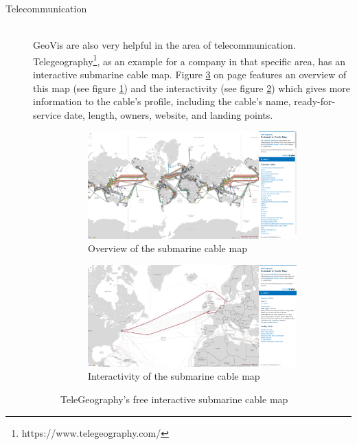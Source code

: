 \begin{description}
\item[Telecommunication] \hfill \\
\ac{GeoVis} are also very helpful in the area of telecommunication. Telegeography\footnote{https://www.telegeography.com/}, as an example for a company in that specific area, has an interactive submarine cable map. Figure \ref{fig:both-submarines} on page \pageref{fig:both-submarines} features an overview of this map (see figure \ref{fig:submarine}) and the interactivity (see figure \ref{fig:submarine-interactive}) which gives more information to the cable’s profile, including the cable’s name, ready-for-service date, length, owners, website, and landing points.

\begin{figure}[!htb]
  \captionsetup[subfigure]{justification=centering}
  \centering
  \begin{subfigure}[b]{0.4\textwidth}
    \includegraphics[width=\textwidth]{images/geovis/submarine.png}
    \caption[Overview of the submarine cable map]{Overview of the submarine cable map}
    \label{fig:submarine}
  \end{subfigure}
  \hfill
  \begin{subfigure}[b]{0.4\textwidth}
    \includegraphics[width=\textwidth]{images/geovis/submarine-interactive.png}
    \caption[Interactivity of the submarine cable map]{Interactivity of the submarine cable map}
    \label{fig:submarine-interactive}
  \end{subfigure}
    \caption[
        TeleGeography’s free interactive submarine cable map, Urldate: 07.2016 \newline
    \small\texttt{\url{http://www.submarinecablemap.com/}}
    ]{TeleGeography’s free interactive submarine cable map}
  \label{fig:both-submarines}
\end{figure}


\end{description}
